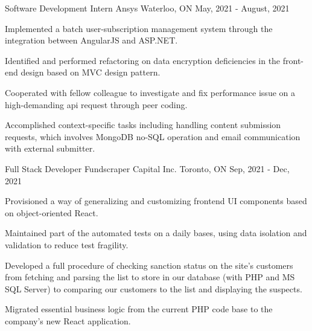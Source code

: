 

\begin{cventries}

  \cventry
	{Software Development Intern} %
	{Ansys} %
	{Waterloo, ON} %
	{May, 2021 - August, 2021} %
	{
		\begin{cvitems} %
			\item {Implemented a batch user-subscription management system through the integration between AngularJS and ASP.NET.}
			\item {Identified and performed refactoring on data encryption deficiencies in the front-end  design based on MVC design pattern.}
			\item {Cooperated with fellow colleague to investigate and fix performance issue on a high-demanding api request through peer coding.}
			\item {Accomplished context-specific tasks including handling content submission requests, which involves MongoDB no-SQL operation and email communication with external submitter.}
		\end{cvitems}
	}

  \cventry
    {Full Stack Developer} %
    {Fundscraper Capital Inc.} %
    {Toronto, ON} %
    {Sep, 2021 - Dec, 2021} %
    {
		\begin{cvitems} %
			\item {Provisioned a way of generalizing and customizing frontend UI components based on object-oriented React.}
			\item {Maintained part of the automated tests on a daily bases, using data isolation and validation to reduce test fragility.}
			\item {Developed a full procedure of checking sanction status on the site's customers from fetching and parsing the list to store in our database (with PHP and MS SQL Server) to comparing our customers to the list and displaying the suspects.}
			\item {Migrated essential business logic from the current PHP code base to the company's new React application.}
		\end{cvitems}
    }


\end{cventries}
